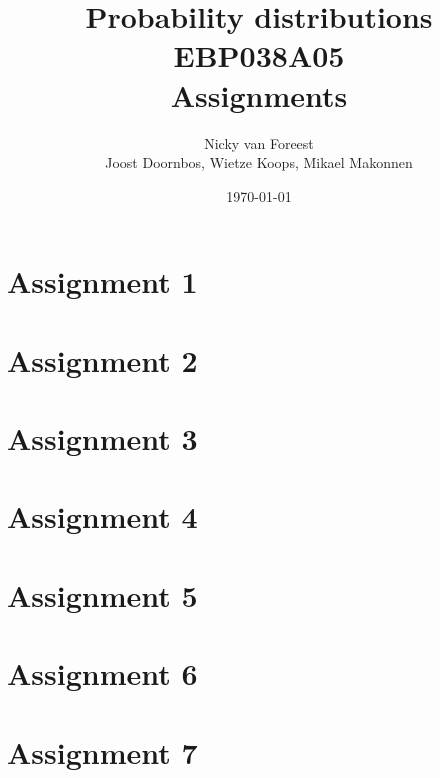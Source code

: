 \documentclass[a4paper,12pt]{article}
\author{Nicky van Foreest \\
  Joost Doornbos, Wietze Koops, Mikael Makonnen
}
\date{\today}
\title{Probability distributions EBP038A05\\
Assignments}
\begin{document}
\maketitle
\tableofcontents





\section{Assignment 1}





\section{Assignment 2}




\section{Assignment 3}





\section{Assignment 4}





\section{Assignment 5}





\section{Assignment 6}






\section{Assignment 7}








% 
% 
\end{document}
